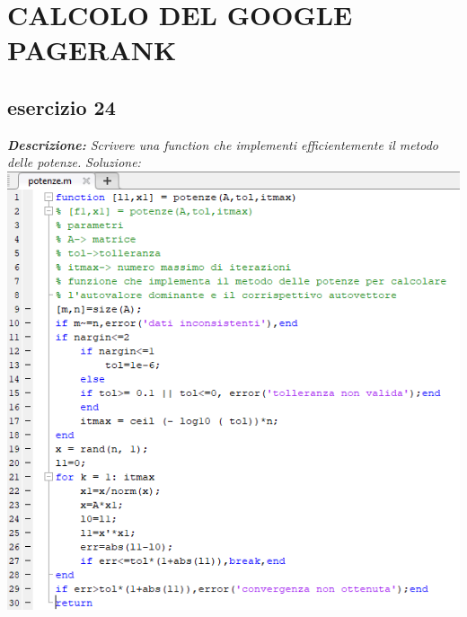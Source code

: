 \chapter{CALCOLO DEL GOOGLE PAGERANK}
\section{esercizio 24}
\textit{\textbf{Descrizione:}  Scrivere una function che implementi efficientemente il metodo delle potenze.}\newline
\noindent\emph{Soluzione: }\newline
\includegraphics[width=1.3\linewidth]{img/potenze.png}\newpage